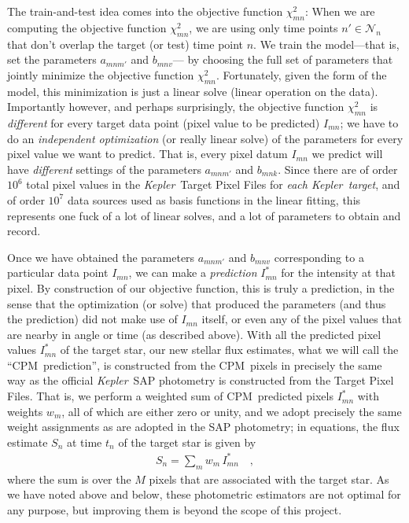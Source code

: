 \documentclass[12pt, preprint]{aastex}
\newcommand{\project}[1]{\textsl{#1}}
\newcommand{\Kepler}{\project{Kepler}}
\newcommand{\name}{CPM}
\newcommand{\set}[1]{\mathcal{#1}}
\begin{document}
The train-and-test idea comes into the objective function $\chi^2_{mn}$:
When we are computing the objective function $\chi^2_{mn}$,
  we are using only time points $n'\in\set{N}_n$ that don't overlap the target (or test) time point $n$.
We train the model---that is, set the parameters $a_{mnm'}$ and $b_{mnv}$---%
  by choosing the full set of parameters that jointly minimize the objective function $\chi^2_{mn}$.
Fortunately, given the form of the model,
  this minimization is just a linear solve (linear operation on the data).
Importantly however, and perhaps surprisingly, the objective function $\chi^2_{mn}$ is \emph{different}
  for every target data point (pixel value to be predicted) $I_{mn}$;
  we have to do an \emph{independent optimization} (or really linear solve)
  of the parameters for every pixel value we want to predict.
That is, every pixel datum $I_{mn}$ we predict will have
  \emph{different} settings of the parameters $a_{mnm'}$ and $b_{mnk}$.
Since there are of order $10^{6}$ total pixel values in the \Kepler\ Target Pixel Files for \emph{each \Kepler\ target},
  and of order $10^7$ data sources used as basis functions in the linear fitting,
  this represents one fuck of a lot of linear solves,
  and a lot of parameters to obtain and record.

Once we have obtained the parameters $a_{mnm'}$ and $b_{mnv}$ corresponding to a particular data point $I_{mn}$,
  we can make a \emph{prediction} $I^{\ast}_{mn}$ for the intensity at that pixel.
By construction of our objective function, this is truly a prediction,
  in the sense that the optimization (or solve) that produced the parameters
  (and thus the prediction)
  did not make use of $I_{mn}$ itself,
  or even any of the pixel values that are nearby in angle or time
  (as described above).
  With all the predicted pixel values $I^{\ast}_{mn}$ of the target star,  
  our new stellar flux estimates,
  what we will call the ``\name\ prediction'',
  is constructed from the \name\ pixels
  in precisely the same way as the official \Kepler\ SAP photometry
  is constructed from the Target Pixel Files.
That is, we perform a weighted sum of \name\ predicted pixels $I^{\ast}_{mn}$ with weights $w_m$,
  all of which are either zero or unity,
  and we adopt precisely the same weight assignments as are adopted in the SAP photometry;
  in equations, the flux estimate $S_n$ at time $t_n$ of the target star is given by
\begin{eqnarray}
S_n = \sum_m w_m\,I^{\ast}_{mn}
\quad ,
\end{eqnarray}
where the sum is over the $M$ pixels that are associated with the target star.
As we have noted above and below, these photometric estimators are not optimal for any purpose,
  but improving them is beyond the scope of this project.
\end{document}

